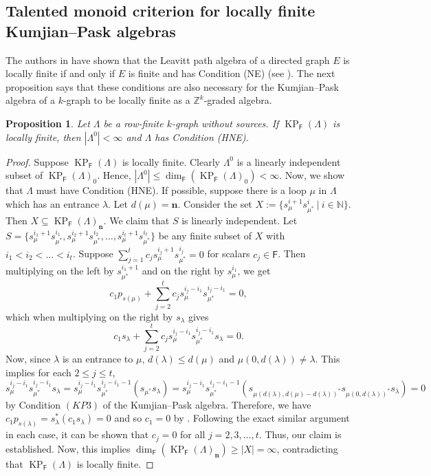 \documentclass[a4paper,reqno,12pt]{amsart}
\numberwithin{equation}{section}
\newtheorem{prop}[thm]{Proposition}
\theoremstyle{definition}
\theoremstyle{remark}
\newcommand{\KP}{\operatorname{KP}}
\newcommand{\N}{\mathbf{n}}
\begin{document}
\subsection{Talented monoid criterion for locally finite Kumjian--Pask algebras}\label{ssec locally finite} The authors in \cite{AAS} have shown that the Leavitt path algebra of a directed graph $E$ is locally finite if and only if $E$ is finite and has Condition (NE) (see \cite[Theorem 1.8]{AAS}). The next proposition says that these conditions are also necessary for the Kumjian--Pask algebra of a $k$-graph to be locally finite as a $\mathbb{Z}^k$-graded algebra. 
\begin{prop}\label{pro Necessary condition for locally finite KPA}
Let $\Lambda$ be a row-finite $k$-graph without sources. If $\KP_\mathsf{F}(\Lambda)$ is locally finite, then $|\Lambda^0|< \infty$ and $\Lambda$ has Condition \textup{(HNE)}.    
\end{prop}
\begin{proof}
Suppose $\KP_\mathsf{F}(\Lambda)$ is locally finite. Clearly $\Lambda^0$ is a linearly independent subset of $\KP_\mathsf{F}(\Lambda)_0$. Hence, $|\Lambda^0|\le \dim_\mathsf{F}(\KP_\mathsf{F}(\Lambda)_0)<\infty$. Now, we show that $\Lambda$ must have Condition (HNE). If possible, suppose there is a loop $\mu$ in $\Lambda$ which has an entrance $\lambda$. Let $d(\mu)=\N$. Consider the set $X:=\{s_\mu^{i+1}s_{\mu^*}^i~|~i\in \mathbb{N}\}$. Then $X\subseteq \KP_\mathsf{F}(\Lambda)_\N$. We claim that $S$ is linearly independent. Let $S=\{s_\mu^{i_1+1}s_{\mu^*}^{i_1},s_\mu^{i_2+1}s_{\mu^*}^{i_2},\ldots,s_\mu^{i_t+1}s_{\mu^*}^{i_t}\}$ be any finite subset of $X$ with $i_1<i_2<\ldots <i_t$. Suppose $\displaystyle{\sum_{j=1}^{t}}c_js_\mu^{i_j+1}s_{\mu^*}^{i_j}=0$ for scalars $c_j\in \mathsf{F}$. Then multiplying on the left by $s_{\mu^*}^{i_1+1}$ and on the right by $s_\mu^{i_1}$, we get \[c_1p_{s(\mu)}+\displaystyle{\sum_{j=2}^{t}}c_js_\mu^{i_j-i_1}s_{\mu^*}^{i_j-i_1}=0,\] which when multiplying on the right by $s_\lambda$ gives \[c_1s_\lambda+\displaystyle{\sum_{j=2}^{t}}c_js_\mu^{i_j-i_1}s_{\mu^*}^{i_j-i_1}s_\lambda=0.\] Now, since $\lambda$ is an entrance to $\mu$, $d(\lambda)\le d(\mu)$ and $\mu(0,d(\lambda))\neq \lambda$. This implies for each $2\le j\le t$, \[s_\mu^{i_j-i_1}s_{\mu^*}^{i_j-i_1}s_\lambda=s_\mu^{i_j-i_1}s_{\mu^*}^{i_j-i_1-1}(s_{\mu^*}s_\lambda)=s_\mu^{i_j-i_1}s_{\mu^*}^{i_j-i_1-1}(s_{\mu(d(\lambda),d(\mu)-d(\lambda))^*}s_{\mu(0,d(\lambda))^*}s_\lambda)=0\] by Condition $(KP3)$ of the Kumjian--Pask algebra. Therefore, we have $c_1 p_{s(\lambda)}=s_{\lambda}^*(c_1s_\lambda)=0$ and so $c_1=0$ by \cite[Theorem 3.4]{Pino}. Following the exact similar argument in each case, it can be shown that $c_j=0$ for all $j=2,3,\ldots,t$. Thus, our claim is established. Now, this implies $\dim_\mathsf{F}(\KP_\mathsf{F}(\Lambda)_\N)\ge |X|=\infty$, contradicting that $\KP_\mathsf{F}(\Lambda)$ is locally finite. 
\end{proof}
\end{document}
